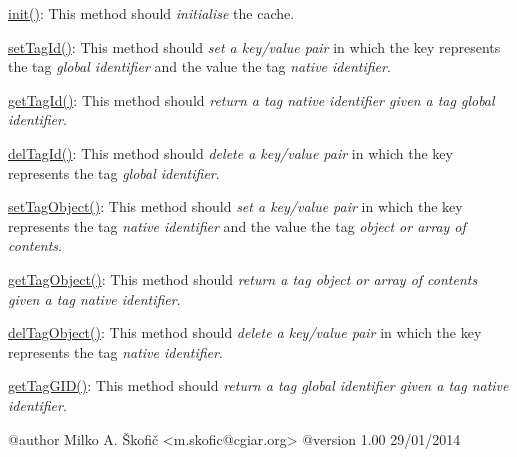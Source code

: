 \begin{DoxyItemize}
\item {\ttfamily \hyperlink{class_ontology_wrapper_1_1_tag_cache_object_a560d3ea289197fbcc0268590bd4c937c}{init()}}\-: This method should {\itshape initialise} the cache. 
\item {\ttfamily \hyperlink{class_ontology_wrapper_1_1_tag_cache_object_a5623fe3e494a29d7518abc5ffe76e688}{set\-Tag\-Id()}}\-: This method should {\itshape set a key/value pair} in which the key represents the tag {\itshape global identifier} and the value the tag {\itshape native identifier}. 
\item {\ttfamily \hyperlink{class_ontology_wrapper_1_1_tag_cache_object_a136e04c97cbefe02abd6f237f2118287}{get\-Tag\-Id()}}\-: This method should {\itshape return a tag native identifier given a tag global identifier}. 
\item {\ttfamily \hyperlink{class_ontology_wrapper_1_1_tag_cache_object_a3374f814f4a1d96470932d105761eead}{del\-Tag\-Id()}}\-: This method should {\itshape delete a key/value pair} in which the key represents the tag {\itshape global identifier}. 
\item {\ttfamily \hyperlink{class_ontology_wrapper_1_1_tag_cache_object_a219ea904f544bde247bd498108dec7e0}{set\-Tag\-Object()}}\-: This method should {\itshape set a key/value pair} in which the key represents the tag {\itshape native identifier} and the value the tag {\itshape object or array of contents}. 
\item {\ttfamily \hyperlink{class_ontology_wrapper_1_1_tag_cache_object_af9f3670137201be86107461026b70a10}{get\-Tag\-Object()}}\-: This method should {\itshape return a tag object or array of contents given a tag native identifier}. 
\item {\ttfamily \hyperlink{class_ontology_wrapper_1_1_tag_cache_object_adc4d98f5c9b1ac96e04bd58107d5b557}{del\-Tag\-Object()}}\-: This method should {\itshape delete a key/value pair} in which the key represents the tag {\itshape native identifier}. 
\item {\ttfamily \hyperlink{class_ontology_wrapper_1_1_tag_cache_object_ac0cb491eae6addb59a132b8fb11f8c31}{get\-Tag\-G\-I\-D()}}\-: This method should {\itshape return a tag global identifier given a tag native identifier}. 
\end{DoxyItemize}\begin{DoxyVerb} @author            Milko A. Škofič <m.skofic@cgiar.org>
 @version   1.00 29/01/2014\end{DoxyVerb}
 

